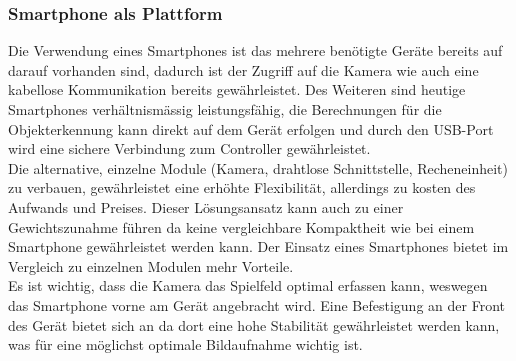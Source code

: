 \subsubsection{Smartphone als Plattform}
	Die Verwendung eines Smartphones ist das mehrere benötigte Geräte bereits auf darauf vorhanden sind, dadurch ist der Zugriff auf die Kamera wie auch eine kabellose Kommunikation bereits gewährleistet. Des Weiteren sind heutige Smartphones verhältnismässig leistungsfähig, die Berechnungen für die Objekterkennung kann direkt auf dem Gerät erfolgen und durch den USB-Port wird eine sichere Verbindung zum Controller gewährleistet.\\
	Die alternative, einzelne Module (Kamera, drahtlose Schnittstelle, Recheneinheit) zu verbauen, gewährleistet eine erhöhte Flexibilität, allerdings zu kosten des Aufwands und Preises. Dieser Lösungsansatz kann auch zu einer Gewichtszunahme führen da keine vergleichbare Kompaktheit wie bei einem Smartphone gewährleistet werden kann. Der Einsatz eines Smartphones bietet im Vergleich zu einzelnen Modulen mehr Vorteile.\\
	Es ist wichtig, dass die Kamera das Spielfeld optimal erfassen kann, weswegen das Smartphone vorne am Gerät angebracht wird. Eine Befestigung an der Front des Gerät bietet sich an da dort eine hohe Stabilität gewährleistet werden kann, was für eine möglichst optimale Bildaufnahme wichtig ist.\\
	
